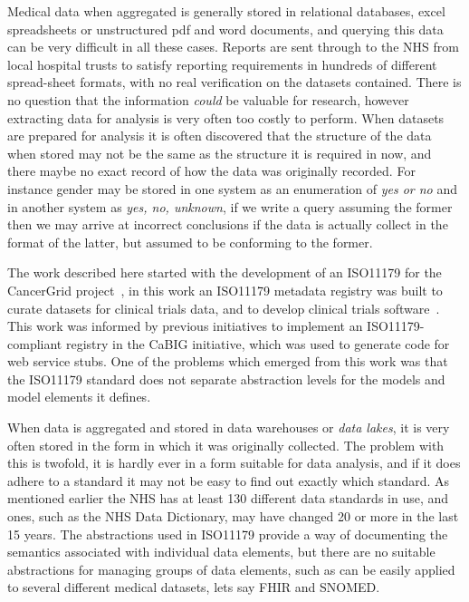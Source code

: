 \documentclass{llncs}
\begin{document}
Medical data when aggregated is generally stored in relational databases, excel spreadsheets or unstructured pdf and word documents, and querying this data can be very difficult in all these cases. Reports are sent through to the NHS from local hospital trusts to satisfy reporting requirements in hundreds of different spread-sheet formats, with no real verification on the datasets contained. There is no question that the information \emph{could} be valuable for research, however extracting data for analysis is very often too costly to perform.  When datasets are prepared for analysis it is often discovered that the structure of the data when stored may not be the same as the structure it is required in now, and there maybe no exact record of how the data was originally recorded. For instance gender may be stored in one system as an enumeration of \emph{yes or no} and in another system as \emph{yes, no, unknown}, if we write a query assuming the former then we may arrive at incorrect conclusions if the data is actually collect in the format of the latter, but assumed to be conforming to the former. 

The work described here started with the development of an ISO11179 for the CancerGrid project~\cite{davi14}, in this work an ISO11179 metadata registry was built to curate datasets for clinical trials data, and to develop clinical trials software~\cite{davi12}. This work was informed by previous initiatives to implement an ISO11179-compliant registry in the CaBIG initiative, which was used to generate code for web service stubs. One of the problems which emerged from this work was that the ISO11179 standard does not separate abstraction levels for the models and model elements it defines.

When data is aggregated and stored in data warehouses or \emph{data lakes}, it is very often stored in the form in which it was originally collected. The problem with this is twofold, it is hardly ever in a form suitable for data analysis, and if it does adhere to a standard it may not be easy to find out exactly which standard. As mentioned earlier the NHS has at least 130 different data standards in use, and ones, such as the NHS Data Dictionary, may have changed 20 or more in the last 15 years. The abstractions used in ISO11179 provide a way of documenting the semantics associated with individual data elements, but there are no suitable abstractions for managing groups of data elements, such as can be easily applied to several different medical datasets, lets say FHIR and SNOMED.
 
\end{document}
